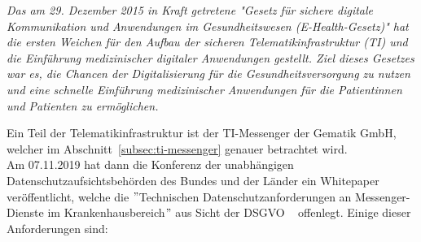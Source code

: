     \textit{Das am 29. Dezember 2015 in Kraft getretene "Gesetz für sichere digitale Kommunikation und Anwendungen im Gesundheitswesen (E-Health-Gesetz)" hat die ersten Weichen für den Aufbau der sicheren Telematikinfrastruktur (TI) und die Einführung medizinischer digitaler Anwendungen gestellt.
    Ziel dieses Gesetzes war es, die Chancen der Digitalisierung für die Gesundheitsversorgung zu nutzen und eine schnelle Einführung medizinischer Anwendungen für die Patientinnen und Patienten zu ermöglichen.}~\cite{ehealthgesetz}

    Ein Teil der Telematikinfrastruktur ist der TI-Messenger der Gematik GmbH, welcher im Abschnitt~\ref{subsec:ti-messenger} genauer betrachtet wird.\\
    Am 07.11.2019 hat dann die Konferenz der unabhängigen Datenschutzaufsichtsbehörden des Bundes und der Länder ein Whitepaper veröffentlicht, welche die \("\)Technischen Datenschutzanforderungen an Messenger-Dienste im\linebreak
    Krankenhausbereich\("\) aus Sicht der DSGVO ~\cite{datenschutzkonferenz} offenlegt.
    Einige dieser Anforderungen sind:

